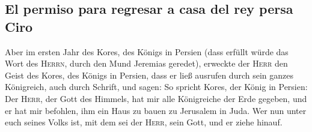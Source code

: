 \hypertarget{el-permiso-para-regresar-a-casa-del-rey-persa-ciro}{%
\subsection{El permiso para regresar a casa del rey persa
Ciro}\label{el-permiso-para-regresar-a-casa-del-rey-persa-ciro}}

 Aber im ersten Jahr des Kores, des Königs in Persien
(dass erfüllt würde das Wort des \textsc{Herrn}, durch den Mund Jeremias
geredet), erweckte der \textsc{Herr} den Geist des Kores, des Königs in
Persien, dass er ließ ausrufen durch sein ganzes Königreich, auch durch
Schrift, und sagen:  So spricht Kores, der König in
Persien: Der \textsc{Herr}, der Gott des Himmels, hat mir alle
Königreiche der Erde gegeben, und er hat mir befohlen, ihm ein Haus zu
bauen zu Jerusalem in Juda. Wer nun unter euch seines Volks ist, mit dem
sei der \textsc{Herr}, sein Gott, und er ziehe hinauf.
